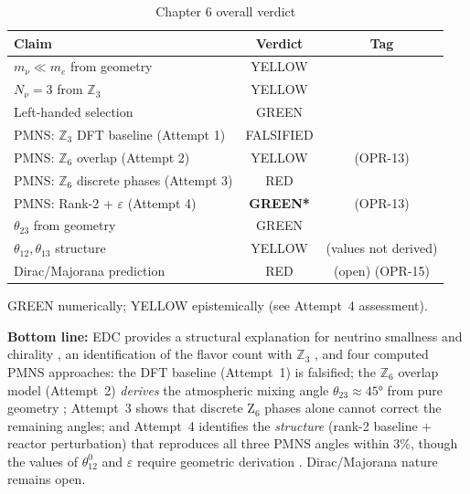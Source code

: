 \begin{table}[ht]
\centering
\caption{Chapter 6 overall verdict}
\label{tab:ch6_verdict}
\begin{tabular}{lcc}
\toprule
\textbf{Claim} & \textbf{Verdict} & \textbf{Tag} \\
\midrule
$m_\nu \ll m_e$ from geometry & YELLOW & \tagDc{} \\
$N_\nu = 3$ from $\mathbb{Z}_3$ & YELLOW & \tagI{} \\
Left-handed selection & GREEN & \tagDc{} \\
PMNS: $\mathbb{Z}_3$ DFT baseline (Attempt 1) & FALSIFIED & \tagDc{} \\
PMNS: $\mathbb{Z}_6$ overlap (Attempt 2) & YELLOW & \tagDc{} (OPR-13) \\
PMNS: $\mathbb{Z}_6$ discrete phases (Attempt 3) & RED & \tagDc{} \\
PMNS: Rank-2 + $\varepsilon$ (Attempt 4) & \textcolor{green!60!black}{\textbf{GREEN*}} & \tagI{} (OPR-13) \\
$\theta_{23}$ from geometry & GREEN & \tagDc{} \\
$\theta_{12}, \theta_{13}$ structure & YELLOW & \tagI{} (values not derived) \\
Dirac/Majorana prediction & RED & (open) (OPR-15) \\
\bottomrule
\end{tabular}

\vspace{0.5em}
{\footnotesize *GREEN numerically; YELLOW epistemically (see Attempt~4 assessment).}
\end{table}

\textbf{Bottom line:} EDC provides a structural explanation for neutrino
smallness and chirality \tagDc{}, an identification of the flavor count with
$\mathbb{Z}_3$ \tagI{}, and four computed PMNS approaches: the DFT baseline (Attempt~1)
is falsified; the $\mathbb{Z}_6$ overlap model (Attempt~2) \emph{derives} the
atmospheric mixing angle $\theta_{23} \approx 45°$ from pure geometry \tagDc{};
Attempt~3 shows that discrete Z$_6$ phases alone cannot correct the remaining angles;
and Attempt~4 identifies the \emph{structure} (rank-2 baseline + reactor perturbation)
that reproduces all three PMNS angles within 3\%, though the values of $\theta_{12}^0$
and $\varepsilon$ require geometric derivation \tagI{}. Dirac/Majorana nature remains open.


